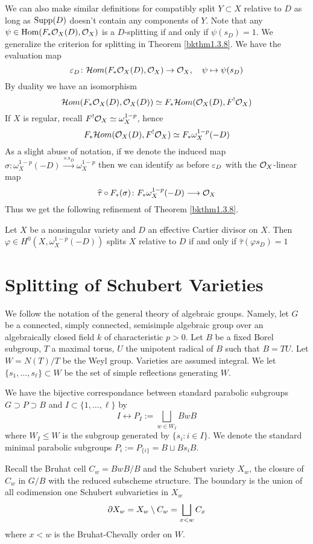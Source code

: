 \documentclass[12pt]{article}
\begin{document}
We can also make similar definitions for compatibly split $Y \subset X$ relative to $D$ as long as $\operatorname{Supp}(D)$ doesn't contain any components of $Y$. Note that any $\psi \in \operatorname{Hom}(F_* \mathcal{O}_X(D), \mathcal{O}_X)$ is a $D$-splitting if and only if $\psi(s_D) = 1$. We generalize the criterion for splitting in Theorem \ref{bkthm1.3.8}. We have the evaluation map
\[\varepsilon_D \colon \mathcal{H} om(F_* \mathcal{O}_X(D), \mathcal{O}_X) \to \mathcal{O}_X, \quad \psi \mapsto \psi(s_D)\]
By duality we have an isomorphism
\[\mathcal{H} om(F_* \mathcal{O}_X(D), \mathcal{O}_X(D)) \simeq F_*\mathcal{H} om(\mathcal{O}_X(D), F^! \mathcal{O}_X)\]
If $X$ is regular, recall $F^! \mathcal{O}_X \simeq \omega_X^{1-p}$, hence
\[F_*\mathcal{H} om(\mathcal{O}_X(D), F^! \mathcal{O}_X) \simeq F_* \omega_X^{1-p}(-D)\]
As a slight abuse of notation, if we denote the induced map $\sigma \colon \omega_X^{1-p}(-D) \xrightarrow{\times s_D} \omega_X^{1-p}$ then we can identify as before $\varepsilon_D$ with the $\mathcal{O}_X$-linear map
\[\widehat{\tau} \circ F_*(\sigma) \colon F_* \omega_X^{1-p}(-D) \longrightarrow \mathcal{O}_X\]
Thus we get the following refinement of Theorem \ref{bkthm1.3.8}.
\begin{thm}\label{bkthm1.4.10}
    Let $X$ be a nonsingular variety and $D$ an effective Cartier divisor on $X$. Then $\varphi \in H^0(X, \omega_X^{1-p}(-D))$ splits $X$ relative to $D$ if and only if $\hat{\tau}(\varphi s_D) = 1$
\end{thm}
\section{Splitting of Schubert Varieties}
We follow the notation of the general theory of algebraic groups. Namely, let $G$ be a connected, simply connected, semisimple algebraic group over an algebraically closed field $k$ of characteristic $p > 0$. Let $B$ be a fixed Borel subgroup, $T$ a maximal torus, $U$ the unipotent radical of $B$ such that $B = TU$. Let $W = N(T)/T$ be the Weyl group. Varieties are assumed integral. We let $\{s_1,\ldots,s_{\ell}\} \subset W$ be the set of simple reflections generating $W$.

We have the bijective correspondance between standard parabolic subgroups $G \supset P \supset B$ and $I \subset \{1,\ldots,\ell\}$ by
\[I \longleftrightarrow P_I := \bigsqcup_{w \in W_I} BwB\]
where $W_I \leq W$ is the subgroup generated by $\{s_{i} \colon i \in I\}$. We denote the standard minimal parabolic subgroups $P_i := P_{\{i\}} = B \sqcup Bs_iB$.

Recall the Bruhat cell $C_w = BwB/B$ and the Schubert variety $X_w$, the closure of $C_w$ in $G/B$ with the reduced subscheme structure. The boundary is the union of all codimension one Schubert subvarieties in $X_w$
\[\partial X_w = X_w \setminus C_w = \bigsqcup_{x < w} C_x\]
where $x < w$ is the Bruhat-Chevally order on $W$.
\end{document}
